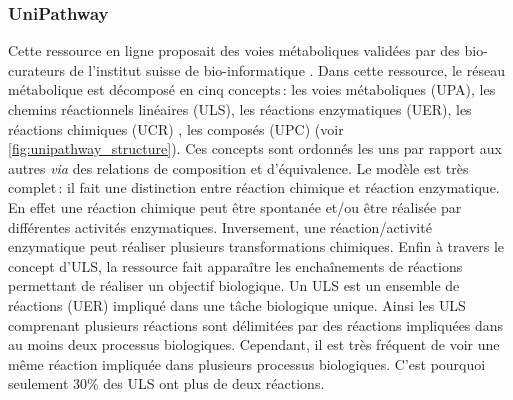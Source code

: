 \begin{refsegment}
    \subsubsection{UniPathway}
    
    Cette ressource en ligne proposait des voies métaboliques validées par des bio-curateurs de l’institut suisse de bio-informatique \cite{morgat2011unipathway}. Dans cette ressource, le réseau métabolique est décomposé en cinq concepts : les voies métaboliques (\acrfull{UPA}), les chemins réactionnels linéaires (\acrfull{ULS}), les réactions enzymatiques (\acrfull{UER}), les réactions chimiques (\acrfull{UCR}) , les composés (\acrfull{UPC}) (voir \cref{fig:unipathway_structure}). Ces concepts sont ordonnés les uns par rapport aux autres \textit{via} des relations de composition et d'équivalence. Le modèle est très complet : il fait une distinction entre réaction chimique et réaction enzymatique. En effet une réaction chimique peut être spontanée et/ou être réalisée par différentes activités enzymatiques. Inversement, une réaction/activité enzymatique peut réaliser plusieurs transformations chimiques. Enfin à travers le concept d'\acrfull{ULS}, la ressource fait apparaître les enchaînements de réactions permettant de réaliser un objectif biologique. Un \acrfull{ULS} est un ensemble de réactions (\acrfull{UER}) impliqué dans une  tâche biologique unique. Ainsi les \acrfull{ULS} comprenant plusieurs réactions sont délimitées par des réactions impliquées dans au moins deux processus biologiques. Cependant, il est très fréquent de voir une même réaction impliquée dans plusieurs processus biologiques. C'est pourquoi seulement 30\% des \acrfull{ULS} ont plus de deux réactions.
    

\end{refsegment}
